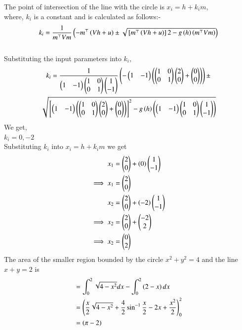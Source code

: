 \documentclass[journal]{IEEEtran}
\begin{document}
The point of intersection of the line with the circle is $x_i=h+k_i m$,\\
where, $k_i$ is a constant and is calculated as follows:-
$$k_i=\frac{1}{m^\top Vm}\left(-m^\top \left(Vh+u\right)\pm \sqrt{{}\left[m^\top \left(Vh+u\right)\right] 2-g\left(h\right)\left(m^\top Vm\right)}\right)$$\\
Substituting the input parameters into $k_i$,\\
\begin{multline}
     k_i =\frac{1}{\begin{pmatrix}1 
 & -1\end{pmatrix}\begin{pmatrix}1 & 0 \\ 0 & 1\end{pmatrix}\begin{pmatrix}1 \\ -1\end{pmatrix}}\left(-\begin{pmatrix}1&-1\end{pmatrix}\left(\begin{pmatrix}1&0\\0&1\end{pmatrix}\begin{pmatrix}2\\0\end{pmatrix}+\begin{pmatrix}0\\0\end{pmatrix}\right)\right)\pm \\
     \sqrt{{}\left[\begin{pmatrix}1&-1\end{pmatrix}\left(\begin{pmatrix}1&0\\0&1\end{pmatrix}\begin{pmatrix}2\\0\end{pmatrix}+\begin{pmatrix}0\\0\end{pmatrix}\right)\right]^2-g\left(h\right)\left(\begin{pmatrix}1&-1\end{pmatrix}\begin{pmatrix}1&0\\0&1\end{pmatrix}\begin{pmatrix}1\\-1\end{pmatrix}\right)} 
\end{multline}
We get,\\
$k_i= 0,-2$\\
Substituting $k_i$ into $x_i=h+k_i m$ we get\\
\begin{align}
     x_1&=\begin{pmatrix}2\\0\end{pmatrix}+\left(0\right)\begin{pmatrix}1\\-1\end{pmatrix}\\
    \implies x_1 &=\begin{pmatrix}2\\0\end{pmatrix}\\
    x_2 &=\begin{pmatrix}2\\0\end{pmatrix}+\left(-2\right)\begin{pmatrix}1\\-1\end{pmatrix}\\
    \implies x_2&=\begin{pmatrix}2\\0\end{pmatrix}+\begin{pmatrix}-2\\2\end{pmatrix}\\
    \implies x_2&=\begin{pmatrix}0\\2\end{pmatrix}
\end{align}
The area of the smaller region bounded by the circle $x^2 + y^2 = 4$ and the line $x + y = 2$ is
\begin{align}
    &=\int_{0}^{2} \sqrt{4-x^2}dx-\int_{0}^{2} \left(2-x\right) dx\\
    &=\left(\frac{x}{2}\sqrt{4-x^2}+\frac{4}{2}\sin^{-1}{\frac{x}{2}}-2x+\frac{x^2}{2}\right)_{0}^{2}\\
    &=\left(\pi-2\right)
\end{align}
\end{document}
